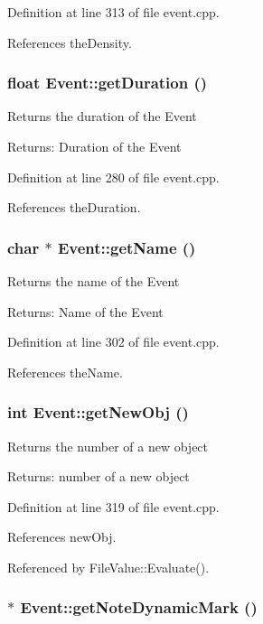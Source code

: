 Definition at line 313 of file event.cpp.

References the\-Density.
\subsubsection{\setlength{\rightskip}{0pt plus 5cm}float Event::get\-Duration ()}\label{classEvent_a14}


Returns the duration of the Event \begin{Desc}
\item[Returns:]Duration of the Event \end{Desc}


Definition at line 280 of file event.cpp.

References the\-Duration.
\subsubsection{\setlength{\rightskip}{0pt plus 5cm}char $\ast$ Event::get\-Name ()}\label{classEvent_a15}


Returns the name of the Event \begin{Desc}
\item[Returns:]Name of the Event \end{Desc}


Definition at line 302 of file event.cpp.

References the\-Name.
\subsubsection{\setlength{\rightskip}{0pt plus 5cm}int Event::get\-New\-Obj ()}\label{classEvent_a18}


Returns the number of a new object \begin{Desc}
\item[Returns:]number of a new object \end{Desc}


Definition at line 319 of file event.cpp.

References new\-Obj.

Referenced by File\-Value::Evaluate().
\subsubsection{$\ast$ Event::get\-Note\-Dynamic\-Mark ()\hspace{0.3cm}{\tt  [inline]}}\label{classEvent_a78}


